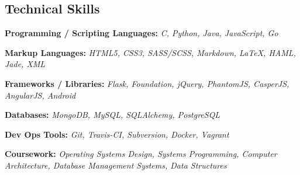 \documentclass[12pt,a4paper,sans]{moderncv}        %
\begin{document}
\vspace{5pt}

\subsection{Technical Skills}

\vspace{5pt}

\begin{itemize}

\item{\textbf{Programming / Scripting Languages:} \textit{C, Python, Java, JavaScript, Go}

\small{}}

\vspace{6pt}

\item{\textbf{Markup Languages:}\textit{ HTML5, CSS3, SASS/SCSS, Markdown, LaTeX, HAML, Jade, XML }

\vspace{3pt}

\small{}}

\vspace{6pt}

\item{\textbf{Frameworks / Libraries:}\textit{ Flask, Foundation, jQuery, PhantomJS, CasperJS, AngularJS, Android}

\vspace{3pt}
\item{\textbf{Databases:}\textit{ MongoDB, MySQL, SQLAlchemy, PostgreSQL} }

\vspace{3pt}

\small{}}

\vspace{6pt}

\item{\textbf{Dev Ops Tools:}\textit{ Git, Travis-CI, Subversion, Docker, Vagrant}

\vspace{3pt}

\small{}}

\vspace{6pt}

\item{\textbf{Coursework:}\textit{ Operating Systems Design, Systems Programming, Computer Architecture, Database Management Systems, Data Structures} }

\vspace{3pt}

\small{}

\vspace{6pt}

\end{itemize}
\end{document}
